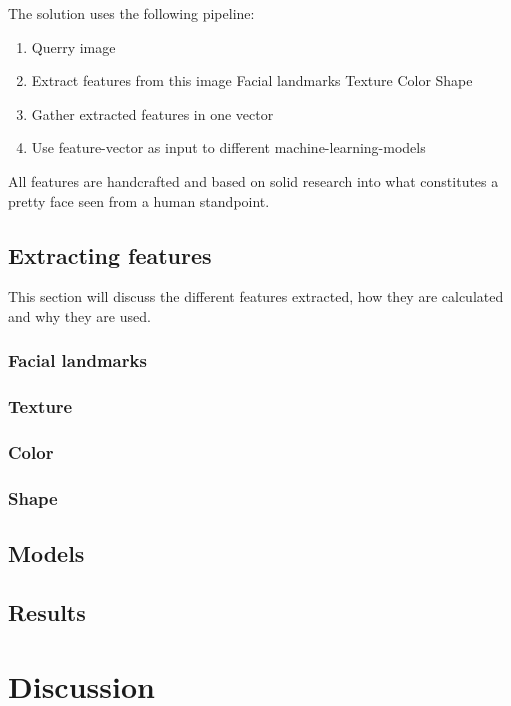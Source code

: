 \documentclass[english]{lni}
\begin{document}
The solution uses the following pipeline:
\begin{enumerate}
    \item Querry image
    \item Extract features from this image
        \subitem Facial landmarks
        \subitem Texture
        \subitem Color
        \subitem Shape
    \item Gather extracted features in one vector
    \item Use feature-vector as input to different machine-learning-models
\end{enumerate}

All features are handcrafted and based on solid research into what constitutes a pretty face seen from a human standpoint.

\subsection{Extracting features}
This section will discuss the different features extracted, how they are calculated and why they are used.

\subsubsection{Facial landmarks}

\subsubsection{Texture}

\subsubsection{Color}

\subsubsection{Shape}

\subsection{Models}

\subsection{Results}

\section{Discussion}


\end{document}
